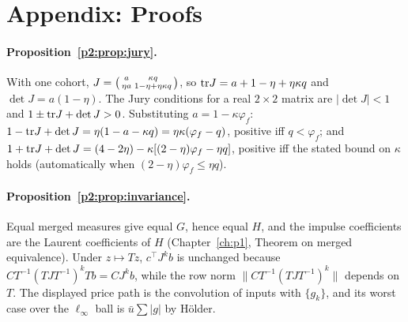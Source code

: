     \section{Appendix: Proofs}\label{p2:app:proofs}
    
\paragraph{Proposition~\ref{p2:prop:jury}.} With one cohort, $J=\begin{psmallmatrix}a&\kappa q\\ \eta a&1-\eta+\eta\kappa q\end{psmallmatrix}$, so ${\rm tr}J=a+1-\eta+\eta\kappa q$ and $\det J=a(1-\eta)$. The Jury conditions for a real $2\times2$ matrix are $|\det J|<1$ and $1\pm{\rm tr}J+\det J>0$. Substituting $a=1-\kappa\varphi_f$: $1-{\rm tr}J+\det J=\eta(1-a-\kappa q)=\eta\kappa(\varphi_f-q)$, positive iff $q<\varphi_f$; and $1+{\rm tr}J+\det J=(4-2\eta)-\kappa[(2-\eta)\varphi_f-\eta q]$, positive iff the stated bound on $\kappa$ holds (automatically when $(2-\eta)\varphi_f\le\eta q$).

\paragraph{Proposition~\ref{p2:prop:invariance}.} Equal merged measures give equal $G$, hence equal $H$, and the impulse coefficients are the Laurent coefficients of $H$ (Chapter~\ref{ch:p1}, Theorem on merged equivalence). Under $z\mapsto Tz$, $c^\top J^kb$ is unchanged because $CT^{-1}(TJT^{-1})^kTb=CJ^kb$, while the row norm $\|CT^{-1}(TJT^{-1})^k\|$ depends on $T$. The displayed price path is the convolution of inputs with $\{g_k\}$, and its worst case over the $\ell_\infty$ ball is $\bar u\sum|g|$ by H\"older.

